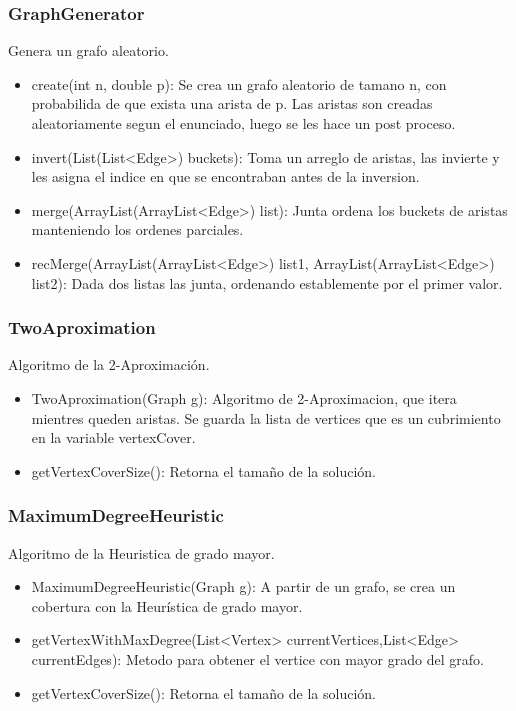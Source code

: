 \documentclass[letterpaper,10pt]{article}
\begin{document}
    \subsubsection{GraphGenerator}

	Genera un grafo aleatorio.
	
	\begin{itemize}
	 \item create(int n, double p): Se crea un grafo aleatorio de tamano n, con probabilida de que exista una arista de p. Las aristas son creadas aleatoriamente segun el enunciado,  luego se les hace un post proceso.
	 \item invert(List(List<Edge>) buckets): Toma un arreglo de aristas, las invierte y les asigna el indice en que se encontraban antes de la inversion.
	 \item merge(ArrayList(ArrayList<Edge>) list): Junta  ordena los buckets de aristas manteniendo los ordenes parciales.
	 \item recMerge(ArrayList(ArrayList<Edge>) list1, ArrayList(ArrayList<Edge>) list2): Dada dos listas las junta, ordenando establemente por el primer valor.
	\end{itemize}
	
	\subsubsection{TwoAproximation}

	Algoritmo de la 2-Aproximación.
	
	\begin{itemize}
	 \item TwoAproximation(Graph g): Algoritmo de 2-Aproximacion, que itera mientres queden aristas. Se guarda la lista de vertices que es un cubrimiento en la variable
     vertexCover.
     \item getVertexCoverSize(): Retorna el tamaño de la solución.
	\end{itemize}
	
	\subsubsection{MaximumDegreeHeuristic}

	Algoritmo de la Heuristica de grado mayor. 
	
	\begin{itemize}
	 \item MaximumDegreeHeuristic(Graph g): A partir de un grafo, se crea un cobertura con la Heurística de grado mayor.
	 \item getVertexWithMaxDegree(List<Vertex> currentVertices,List<Edge> currentEdges): Metodo para obtener el vertice con mayor grado del grafo.
	 \item getVertexCoverSize(): Retorna el tamaño de la solución.
	\end{itemize}
	
\end{document}
